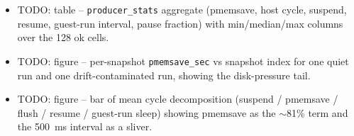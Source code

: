 \documentclass[conference]{IEEEtran}
\begin{document}
\begin{itemize}
\begin{itemize}
          \item Silent dump-cleanup failure: \texttt{unlink} failed under a
                root-owned \texttt{imageDir}, so every dump was retained and
                disk pressure inflated \texttt{pmemsave} (up to
                \SIrange{15}{31}{\second} on a near-full filesystem). Fixed
                with a \texttt{sudo}-fallback purge and producer self-clean.
          \item Methodological point: neither bug is visible without the six
                timestamps. The instrumentation is load-bearing precisely
                because it makes silent mis-calibration loud.
        \end{itemize}
  \item TODO: table -- \texttt{producer\_stats} aggregate (pmemsave, host
        cycle, suspend, resume, guest-run interval, pause fraction) with
        min/median/max columns over the 128 ok cells.
  \item TODO: figure -- per-snapshot \texttt{pmemsave\_sec} vs snapshot index
        for one quiet run and one drift-contaminated run, showing the
        disk-pressure tail.
  \item TODO: figure -- bar of mean cycle decomposition
        (suspend / pmemsave / flush / resume / guest-run sleep) showing
        pmemsave as the $\sim$81\% term and the \SI{500}{\milli\second}
        interval as a sliver.
\end{itemize}

\end{document}
